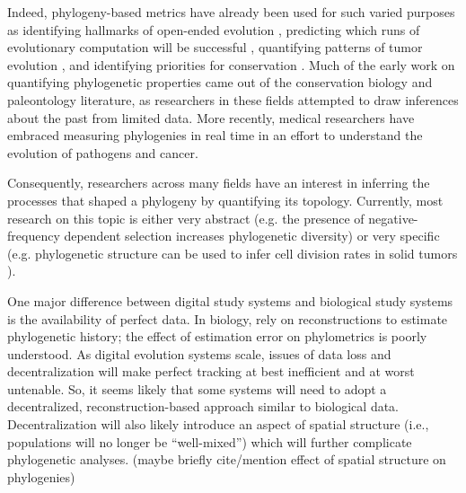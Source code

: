 Indeed, phylogeny-based metrics have already been used for such varied purposes as identifying hallmarks of open-ended evolution \citep{dolsonMODESToolboxMeasurements2019}, predicting which runs of evolutionary computation will be successful \citep{hernandezWhatCanPhylogenetic2022a, shahbandeganUntanglingPhylogeneticDiversity2022a}, quantifying patterns of tumor evolution \citep{scottInferringTumorProliferative2020, lewinsohnStatedependentEvolutionaryModels2023}, and identifying priorities for conservation \citep{forestPreservingEvolutionaryPotential2007}. Much of the early work on quantifying phylogenetic properties came out of the conservation biology and paleontology literature, as researchers in these fields attempted to draw inferences about the past from limited data. More recently, medical researchers have embraced measuring phylogenies in real time in an effort to understand the evolution of pathogens and cancer. 

Consequently, researchers across many fields have an interest in inferring the processes that shaped a phylogeny by quantifying its topology. Currently, most research on this topic is either very abstract (e.g. the presence of negative-frequency dependent selection increases phylogenetic diversity) or very specific (e.g. phylogenetic structure can be used to infer cell division rates in solid tumors \citep{lewinsohnStatedependentEvolutionaryModels2023}). 


One major difference between digital study systems and biological study systems is the availability of perfect data.
In biology, rely on reconstructions to estimate phylogenetic history; the effect of estimation error on phylometrics is poorly understood.
As digital evolution systems scale, issues of data loss and decentralization will make perfect tracking at best inefficient and at worst untenable.
So, it seems likely that some systems will need to adopt a decentralized, reconstruction-based approach similar to biological data.
Decentralization will also likely introduce an aspect of spatial structure (i.e., populations will no longer be ``well-mixed'') which will further complicate phylogenetic analyses.
(maybe briefly cite/mention effect of spatial structure on phylogenies)

